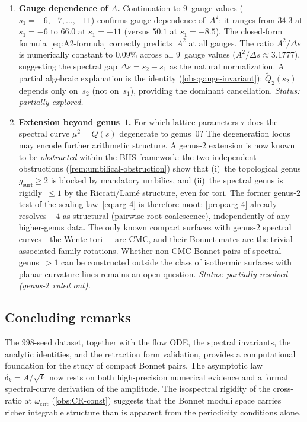 \documentclass[11pt,a4paper]{article}
\theoremstyle{plain}
\theoremstyle{definition}
\theoremstyle{remark}
\begin{document}
\begin{enumerate}[label=\textbf{OP\arabic*.},nosep]
\item \textbf{Gauge dependence of $A$.}
  Continuation to $9$~gauge values ($s_1 = -6, -7, \ldots, -11$) confirms
  gauge-dependence of~$A^2$: it ranges from $34.3$ at $s_1 = -6$ to
  $66.0$ at $s_1 = -11$ (versus $50.1$ at $s_1 = -8.5$).
  The closed-form formula~\eqref{eq:A2-formula}
  correctly predicts~$A^2$ at all gauges.
  The ratio $A^2/\Delta s$ is numerically constant to $0.09\%$
  across all $9$~gauge values ($A^2/\Delta s \approx 3.1777$),
  suggesting the spectral gap $\Delta s = s_2 - s_1$ as the
  natural normalization.  A partial algebraic explanation is
  the identity (\cref{obs:gauge-invariant}): $\tilde Q_2(s_2)$ depends
  only on~$s_2$ (not on~$s_1$), providing the dominant cancellation.
  \emph{Status: partially explored.}

\item \textbf{Extension beyond genus~$1$.}
  For which lattice parameters $\tau$ does the spectral curve
  $\mu^2 = Q(s)$ degenerate to genus~$0$?  The degeneration locus
  may encode further arithmetic structure.
  A genus-$2$ extension is now known to be \emph{obstructed}
  within the BHS framework:
  the two independent obstructions
  (\cref{rem:umbilical-obstruction}) show that
  (i)~the topological genus $g_{\mathrm{surf}} \geq 2$ is
  blocked by mandatory umbilics, and
  (ii)~the spectral genus is rigidly~$\leq 1$
  by the Riccati/Lam\'e structure, even for tori.
  The former genus-$2$ test of the scaling
  law~\eqref{eq:arg-4} is therefore moot:
  \cref{prop:arg-4} already resolves $-4$ as structural
  (pairwise root coalescence), independently of any
  higher-genus data.
  The only known compact surfaces with genus-$2$ spectral
  curves---the Wente tori~\cite{Wen86,Bob91}---are CMC, and
  their Bonnet mates are the trivial associated-family rotations.
  Whether non-CMC Bonnet pairs of spectral genus~$>1$ can
  be constructed outside the class of isothermic surfaces
  with planar curvature lines remains an open question.
  \emph{Status: partially resolved (genus-$2$ ruled out).}
\end{enumerate}

\subsection{Concluding remarks}
The $998$-seed dataset, together with the flow ODE, the spectral
invariants, the analytic identities, and the retraction form
validation, provides a computational foundation
for the study of compact Bonnet pairs.  The asymptotic law
$\delta_k = A/\sqrt{k}$ now rests on both high-precision numerical
evidence and a formal spectral-curve derivation of the amplitude.
The isospectral rigidity of the cross-ratio at
$\omega_{\mathrm{crit}}$ (\cref{obs:CR-const}) suggests that
the Bonnet moduli space carries richer integrable structure than
is apparent from the periodicity conditions alone.
\end{document}
